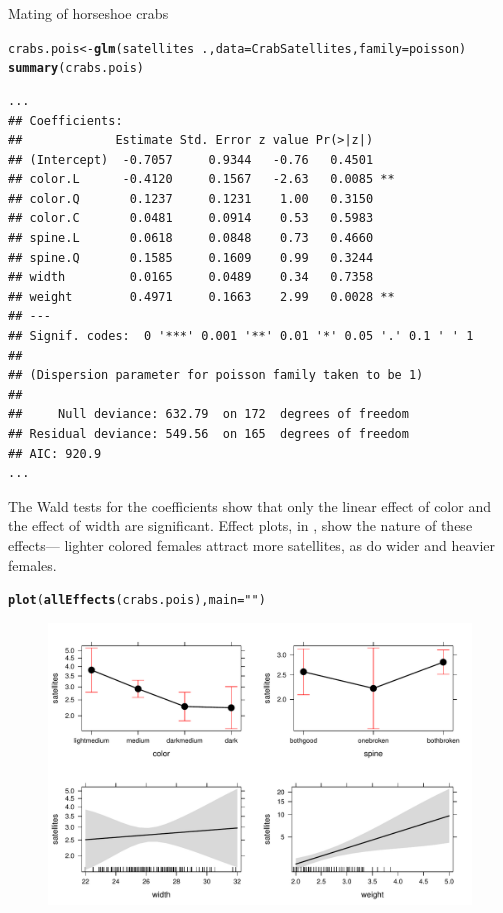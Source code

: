 \documentclass[11pt]{book}\usepackage[]{graphicx}\usepackage[]{color}
\makeatletter
\newcommand{\hlstr}[1]{\textcolor[rgb]{0.192,0.494,0.8}{#1}}%
\newcommand{\hlopt}[1]{\textcolor[rgb]{0,0,0}{#1}}%
\newcommand{\hlstd}[1]{\textcolor[rgb]{0.345,0.345,0.345}{#1}}%
\newcommand{\hlkwb}[1]{\textcolor[rgb]{0.69,0.353,0.396}{#1}}%
\newcommand{\hlkwc}[1]{\textcolor[rgb]{0.333,0.667,0.333}{#1}}%
\newcommand{\hlkwd}[1]{\textcolor[rgb]{0.737,0.353,0.396}{\textbf{#1}}}%
\newenvironment{kframe}{%
 \def\at@end@of@kframe{}%
 \ifinner\ifhmode%
  \def\at@end@of@kframe{\end{minipage}}%
  \begin{minipage}{\columnwidth}%
 \fi\fi%
 \def\FrameCommand##1{\hskip\@totalleftmargin \hskip-\fboxsep
 \colorbox{shadecolor}{##1}\hskip-\fboxsep
     \hskip-\linewidth \hskip-\@totalleftmargin \hskip\columnwidth}%
 \MakeFramed {\advance\hsize-\width
   \@totalleftmargin\z@ \linewidth\hsize
   \@setminipage}}%
 {\par\unskip\endMakeFramed%
 \at@end@of@kframe}
\newenvironment{knitrout}{}{} %
\renewenvironment{knitrout}{\small\renewcommand{\baselinestretch}{.85}}{} %
\makeatother
\begin{document}
\begin{Example}[crabs1]{Mating of horseshoe crabs}
\begin{knitrout}
\color{fgcolor}\begin{kframe}
\begin{alltt}
\hlstd{crabs.pois} \hlkwb{<-} \hlkwd{glm}\hlstd{(satellites} \hlopt{~} \hlstd{.,} \hlkwc{data}\hlstd{=CrabSatellites,} \hlkwc{family}\hlstd{=poisson)}
\hlkwd{summary}\hlstd{(crabs.pois)}
\end{alltt}
\begin{verbatim}
...
## Coefficients:
##             Estimate Std. Error z value Pr(>|z|)   
## (Intercept)  -0.7057     0.9344   -0.76   0.4501   
## color.L      -0.4120     0.1567   -2.63   0.0085 **
## color.Q       0.1237     0.1231    1.00   0.3150   
## color.C       0.0481     0.0914    0.53   0.5983   
## spine.L       0.0618     0.0848    0.73   0.4660   
## spine.Q       0.1585     0.1609    0.99   0.3244   
## width         0.0165     0.0489    0.34   0.7358   
## weight        0.4971     0.1663    2.99   0.0028 **
## ---
## Signif. codes:  0 '***' 0.001 '**' 0.01 '*' 0.05 '.' 0.1 ' ' 1
## 
## (Dispersion parameter for poisson family taken to be 1)
## 
##     Null deviance: 632.79  on 172  degrees of freedom
## Residual deviance: 549.56  on 165  degrees of freedom
## AIC: 920.9
...
\end{verbatim}
\end{kframe}
\end{knitrout}
The Wald tests for the coefficients show that only the linear effect of color and the effect
of width are significant.
Effect plots, in , show the nature of these
effects--- lighter colored females attract more satellites, as do wider and heavier females.

\begin{knitrout}
\color{fgcolor}\begin{kframe}
\begin{alltt}
\hlkwd{plot}\hlstd{(}\hlkwd{allEffects}\hlstd{(crabs.pois),} \hlkwc{main}\hlstd{=}\hlstr{""}\hlstd{)}
\end{alltt}
\end{kframe}\begin{figure}[!htbp]


\centerline{\includegraphics[width=\textwidth]{ch09/fig/crabs1-eff1-1} }


\end{figure}
\end{knitrout}
\end{Example}
\end{document}
